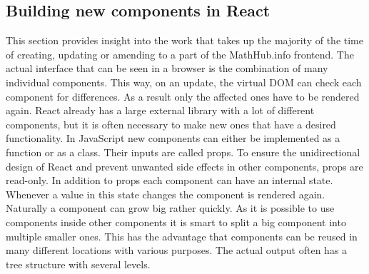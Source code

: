 \documentclass[11pt,a4paper]{article}
\begin{document}
\subsection{Building new components in React} \label{components} 
This section provides insight into the work that takes up the majority of the time of creating, updating or amending to a part of the MathHub.info frontend. 
The actual interface that can be seen in a browser is the combination of many individual components.
This way, on an update, the virtual DOM can check each component for differences.
As a result only the affected ones have to be rendered again.
\newline \newline
React already has a large external library with a lot of different components, but it is often necessary to make new ones that have a desired functionality.
In JavaScript new components can either be implemented as a function or as a class.
Their inputs are called props.
To ensure the unidirectional design of React and prevent unwanted side effects in other components, props are read-only.
In addition to props each component can have an internal state.
Whenever a value in this state changes the component is rendered again.
Naturally a component can grow big rather quickly.
As it is possible to use components inside other components it is smart to split a big component into multiple smaller ones.
This has the advantage that components can be reused in many different locations with various purposes.
The actual output often has a tree structure with several levels.
\end{document}
